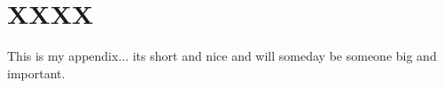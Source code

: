 \appendix 
{}

\chapter{XXXX}

This is my appendix... its short and nice and will someday 
be someone big and important.
